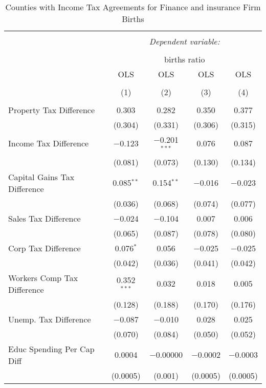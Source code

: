 
\begin{table}[!htbp] \centering 
  \caption{Counties with Income Tax Agreements for  Finance and insurance Firm Births} 
  \label{52rd} 
\begin{tabular}{@{\extracolsep{5pt}}lcccc} 
\\[-1.8ex]\hline 
\hline \\[-1.8ex] 
 & \multicolumn{4}{c}{\textit{Dependent variable:}} \\ 
\cline{2-5} 
\\[-1.8ex] & \multicolumn{4}{c}{births ratio} \\ 
 & OLS & OLS & OLS & OLS \\ 
\\[-1.8ex] & (1) & (2) & (3) & (4)\\ 
\hline \\[-1.8ex] 
 Property Tax Difference & 0.303 & 0.282 & 0.350 & 0.377 \\ 
  & (0.304) & (0.331) & (0.306) & (0.315) \\ 
  Income Tax Difference & $-$0.123 & $-$0.201$^{***}$ & 0.076 & 0.087 \\ 
  & (0.081) & (0.073) & (0.130) & (0.134) \\ 
  Capital Gains Tax Difference & 0.085$^{**}$ & 0.154$^{**}$ & $-$0.016 & $-$0.023 \\ 
  & (0.036) & (0.068) & (0.074) & (0.077) \\ 
  Sales Tax Difference & $-$0.024 & $-$0.104 & 0.007 & 0.006 \\ 
  & (0.065) & (0.087) & (0.078) & (0.080) \\ 
  Corp Tax Difference & 0.076$^{*}$ & 0.056 & $-$0.025 & $-$0.025 \\ 
  & (0.042) & (0.036) & (0.041) & (0.042) \\ 
  Workers Comp Tax Difference & 0.352$^{***}$ & 0.032 & 0.018 & 0.005 \\ 
  & (0.128) & (0.188) & (0.170) & (0.176) \\ 
  Unemp. Tax Difference & $-$0.087 & $-$0.010 & 0.028 & 0.025 \\ 
  & (0.070) & (0.084) & (0.050) & (0.052) \\ 
  Educ Spending Per Cap Diff & 0.0004 & $-$0.00000 & $-$0.0002 & $-$0.0003 \\ 
  & (0.0005) & (0.001) & (0.0005) & (0.0005) \\ 

\end{tabular}
\end{table}

